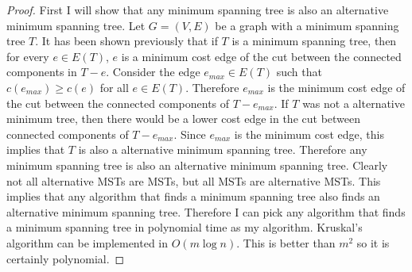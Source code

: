 \documentclass[11pt, oneside]{article}
\begin{document}
\begin{enumerate}
\begin{enumerate}
        \begin{proof}
          First I will show that any minimum spanning tree is also an
          alternative minimum spanning tree.
          Let $G = (V, E)$ be a graph with a minimum spanning tree $T$.
          It has been shown previously that if $T$ is a minimum spanning tree,
          then for every $e \in E(T)$, $e$ is a minimum cost edge of the cut between
          the connected components in $T - e$.
          Consider the edge $e_{max} \in E(T)$ such that $c(e_{max}) \ge c(e)$
          for all $e \in E(T)$.
          Therefore $e_{max}$ is the minimum cost edge of the cut between the
          connected components of $T - e_{max}$.
          If $T$ was not a alternative minimum tree, then there would be a
          lower cost edge in the cut between connected components of
          $T - e_{max}$.
          Since $e_{max}$ is the minimum cost edge, this implies that $T$ is
          also a alternative minimum spanning tree.
          Therefore any minimum spanning tree is also an alternative minimum
          spanning tree.
          Clearly not all alternative MSTs are MSTs, but all MSTs are alternative
          MSTs.
          This implies that any algorithm that finds a minimum spanning tree
          also finds an alternative minimum spanning tree.
          Therefore I can pick any algorithm that finds a minimum spanning
          tree in polynomial time as my algorithm.
          Kruskal's algorithm can be implemented in $O(m \log{n})$.
          This is better than $m^2$ so it is certainly polynomial.
        \end{proof}
    \end{enumerate}
\end{enumerate}
\end{document}
